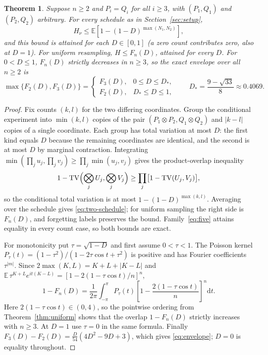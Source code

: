 \documentclass[11pt,a4paper]{article}
\newtheorem{theorem}{Theorem}[section]
\theoremstyle{definition}\newtheorem{definition}[theorem]{Definition}
\theoremstyle{remark}\newtheorem{remark}[theorem]{Remark}
\newcommand{\TV}{\operatorname{TV}}
\newcommand{\E}{\mathbb E}
\newcommand{\dd}{\mathrm d}
\begin{document}
\begin{theorem}\label{thm:twoactive}
Suppose $n\ge2$ and $P_i=Q_i$ for all $i\ge3$, with $(P_1,Q_1)$ and $(P_2,Q_2)$ arbitrary. For every schedule as in Section~\ref{sec:setup},
\begin{equation}\label{eq:two-schedule}
H_\nu\le\E\left[1-(1-D)^{\max(N_1,N_2)}\right],
\end{equation}
and this bound is attained for each $D\in[0,1]$ (a zero count contributes zero, also at $D=1$). For uniform resampling, $H\le F_n(D)$, attained for every $D$. For $0<D\le1$, $F_n(D)$ strictly decreases in $n\ge3$, so the exact envelope over all $n\ge2$ is
\begin{equation}\label{eq:envelope}
\max\{F_2(D),F_3(D)\}=
\begin{cases}
F_3(D),&0\le D\le D_*,\\
F_2(D),&D_*\le D\le1,
\end{cases}
\qquad D_* =\frac{9-\sqrt{33}}8\approx0.4069.
\end{equation}
\end{theorem}
\begin{proof}
Fix counts $(k,l)$ for the two differing coordinates. Group the conditional experiment into $\min(k,l)$ copies of the pair $(P_1\otimes P_2,Q_1\otimes Q_2)$ and $|k-l|$ copies of a single coordinate. Each group has total variation at most $D$: the first kind equals $D$ because the remaining coordinates are identical, and the second is at most $D$ by marginal contraction. Integrating $\min(\prod_j u_j,\prod_j v_j)\ge\prod_j\min(u_j,v_j)$ gives the product-overlap inequality
\[
1-\TV\Bigl(\bigotimes_j U_j,\bigotimes_j V_j\Bigr)
\ge\prod_j\bigl[1-\TV(U_j,V_j)\bigr],
\]
so the conditional total variation is at most $1-(1-D)^{\max(k,l)}$. Averaging over the schedule gives \eqref{eq:two-schedule}; for uniform sampling the right side is $F_n(D)$, and forgetting labels preserves the bound. Family~\eqref{eq:five} attains equality in every count case, so both bounds are exact.

For monotonicity put $\tau=\sqrt{1-D}$ and first assume $0<\tau<1$. The Poisson kernel
$P_\tau(t)=(1-\tau^2)/(1-2\tau\cos t+\tau^2)$ is positive and has Fourier coefficients $\tau^{|m|}$. Since $2\max(K,L)=K+L+|K-L|$ and $\E\,\tau^{K+L}e^{it(K-L)}=[1-2(1-\tau\cos t)/n]^n$,
\begin{equation}\label{eq:poisson}
1-F_n(D)=\frac1{2\pi}\int_{-\pi}^{\pi}P_\tau(t)
\left[1-\frac{2(1-\tau\cos t)}n\right]^n\dd t.
\end{equation}
Here $2(1-\tau\cos t)\in(0,4)$, so the pointwise ordering from Theorem~\ref{thm:uniform} shows that the overlap $1-F_n(D)$ strictly increases with $n\ge3$. At $D=1$ use $\tau=0$ in the same formula. Finally $F_3(D)-F_2(D)=\frac{D}{54}(4D^2-9D+3)$, which gives \eqref{eq:envelope}; $D=0$ is equality throughout.
\end{proof}
\end{document}
